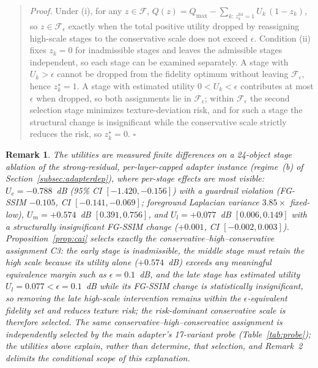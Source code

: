\documentclass[times,twocolumn,final]{elsarticle}
\newtheorem{remark}{Remark} %
\providecommand{\DIFadd}[1]{{\protect\color{blue} \sf #1}} %
\begin{document}
\begin{quote}\small
\DIFadd{\textit{Proof.} Under (i), for any $z\in\mathcal{F}$, $Q(z)=Q_{\max}-\sum_{k:\,z_k^{\mathrm{fid}}=1}U_k\,(1-z_k)$, so $z\in\mathcal{F}_\epsilon$ exactly when the total positive utility dropped by reassigning high-scale stages to the conservative scale does not exceed $\epsilon$. Condition (ii) fixes $z_k=0$ for inadmissible stages and leaves the admissible stages independent, so each stage can be examined separately. A stage with $U_k>\epsilon$ cannot be dropped from the fidelity optimum without leaving $\mathcal{F}_\epsilon$, hence $z_k^{\star}=1$. A stage with estimated utility $0<U_k<\epsilon$ contributes at most $\epsilon$ when dropped, so both assignments lie in $\mathcal{F}_\epsilon$; within $\mathcal{F}_\epsilon$ the second selection stage minimizes texture-deviation risk, and for such a stage the structural change is insignificant while the conservative scale strictly reduces the risk, so $z_k^{\star}=0$. }\hfill\DIFadd{$\square$
}\end{quote}

\begin{remark}
\DIFadd{The utilities are measured finite differences on a 24-object stage ablation of the strong-residual, per-layer-capped adapter instance (regime~(b) of Section~\ref{subsec:adapterdep}), where per-stage effects are most visible: $U_e=-0.788$~dB (95\% CI $[-1.420,-0.156]$) with a guardrail violation (FG-SSIM $-0.105$, CI $[-0.141,-0.069]$; foreground Laplacian variance $3.85\times$ fixed-low), $U_m=+0.574$~dB $[0.391,0.756]$, and $U_l=+0.077$~dB $[0.006,0.149]$ with a structurally insignificant FG-SSIM change ($+0.001$, CI $[-0.002,0.003]$). Proposition~\ref{prop:cai} selects exactly the conservative--high--conservative assignment C3: the early stage is inadmissible, the middle stage must retain the high scale because its utility alone ($+0.574$~dB) exceeds any meaningful equivalence margin such as $\epsilon=0.1$~dB, and the late stage has estimated utility $U_l=0.077<\epsilon=0.1$~dB while its FG-SSIM change is statistically insignificant, so removing the late high-scale intervention remains within the $\epsilon$-equivalent fidelity set and reduces texture risk; the risk-dominant conservative scale is therefore selected. The same conservative--high--conservative assignment is independently selected by the main adapter's 17-variant probe (Table~\ref{tab:probe}); the utilities above explain, rather than determine, that selection, and Remark~2 delimits the conditional scope of this explanation.
}\end{remark}
\end{document}
